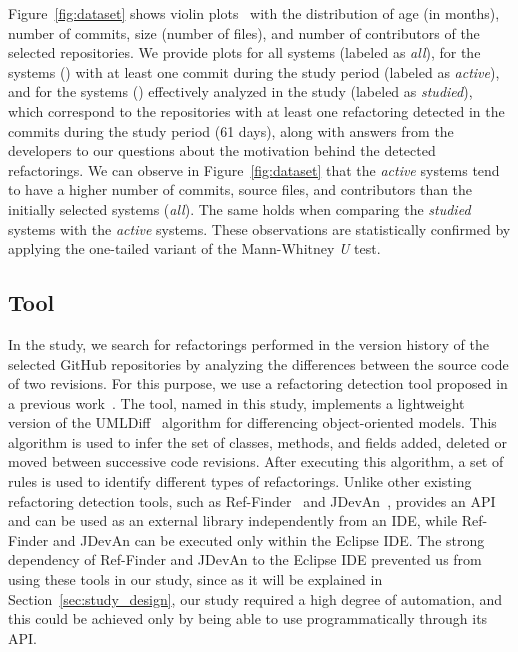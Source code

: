Figure~\ref{fig:dataset} shows violin plots~\citep{Hintze.Nelson:1998} with the distribution of age (in months), number of commits, size (number of  files), and number of contributors of the selected repositories.
We provide plots for all \totalProjects systems (labeled as \textit{all}), for the \activeProjects systems (\activeProjectsPercentage) with at least one commit during the study period (labeled as \textit{active}),
and for the \studiedProjects systems (\studiedProjectsPercentage) effectively analyzed in the study (labeled as \textit{studied}),
which correspond to the repositories with at least one refactoring detected in the commits during the study period (61 days),
along with answers from the developers to our questions about the motivation behind the detected refactorings.
We can observe in Figure~\ref{fig:dataset} that the \textit{active} systems tend to have a higher number of commits, source files, and contributors than the initially selected systems (\textit{all}).
The same holds when comparing the \textit{studied} systems with the \textit{active} systems.
These observations are statistically confirmed by applying the one-tailed variant of the Mann-Whitney \textit{U} test.








\subsection{\toolName Tool}

In the study, we search for refactorings performed in the version history of the selected GitHub repositories by analyzing the differences between the source code of two revisions.
For this purpose, we use a refactoring detection tool proposed in a previous work~\citep{tsantalis_empiricalstudy}.
The tool, named \toolName in this study, implements a lightweight version of the UMLDiff~\citep{Xing:2005} algorithm for differencing  object-oriented models.
This algorithm is used to infer the set of classes, methods, and fields added, deleted or moved between successive code revisions.
After executing this algorithm, a set of rules is used to identify different types of refactorings.
Unlike other existing refactoring detection tools, such as Ref-Finder~\citep{Kim:2010:RefFinder} and JDevAn~\citep{Xing:2008:JDevAn}, \toolName provides an API and can be used as an external library independently from an IDE,
while Ref-Finder and JDevAn can be executed only within the Eclipse IDE.
The strong dependency of Ref-Finder and JDevAn to the Eclipse IDE prevented us from using these tools in our study,
since as it will be explained in Section~\ref{sec:study_design}, our study required a high degree of automation,
and this could be achieved only by being able to use \toolName programmatically through its API.



